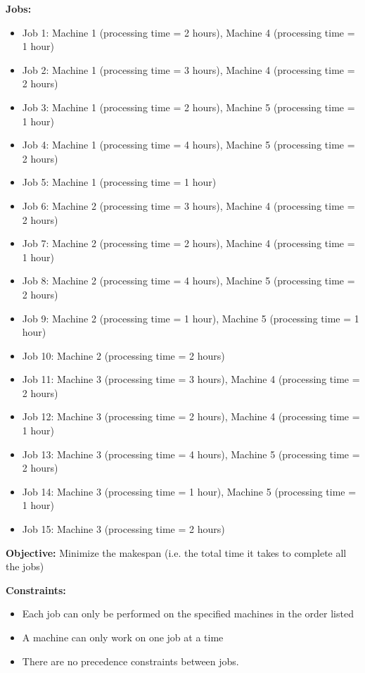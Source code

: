 {\textbf{Jobs:}
\begin{itemize}
    \item Job 1: Machine 1 (processing time = 2 hours), Machine 4 (processing time = 1 hour)
    \item Job 2: Machine 1 (processing time = 3 hours), Machine 4 (processing time = 2 hours)
    \item Job 3: Machine 1 (processing time = 2 hours), Machine 5 (processing time = 1 hour)
    \item Job 4: Machine 1 (processing time = 4 hours), Machine 5 (processing time = 2 hours)
    \item Job 5: Machine 1 (processing time = 1 hour)
    \item Job 6: Machine 2 (processing time = 3 hours), Machine 4 (processing time = 2 hours)
    \item Job 7: Machine 2 (processing time = 2 hours), Machine 4 (processing time = 1 hour)
    \item Job 8: Machine 2 (processing time = 4 hours), Machine 5 (processing time = 2 hours)
    \item Job 9: Machine 2 (processing time = 1 hour), Machine 5 (processing time = 1 hour)
    \item Job 10: Machine 2 (processing time = 2 hours)
    \item Job 11: Machine 3 (processing time = 3 hours), Machine 4 (processing time = 2 hours)
    \item Job 12: Machine 3 (processing time = 2 hours), Machine 4 (processing time = 1 hour)
    \item Job 13: Machine 3 (processing time = 4 hours), Machine 5 (processing time = 2 hours)
    \item Job 14: Machine 3 (processing time = 1 hour), Machine 5 (processing time = 1 hour)
    \item Job 15: Machine 3 (processing time = 2 hours)
\end{itemize}

\textbf{Objective:} Minimize the makespan (i.e. the total time it takes to complete all the jobs)

\textbf{Constraints:}
\begin{itemize}
    \item Each job can only be performed on the specified machines in the order listed
    \item A machine can only work on one job at a time
    \item There are no precedence constraints between jobs.
\end{itemize}

}
